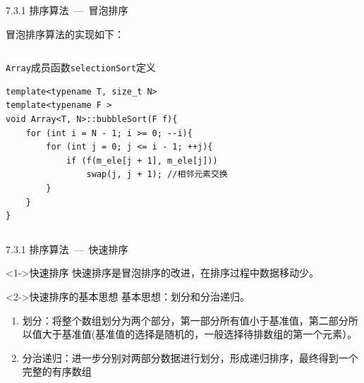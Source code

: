 
\begin{frame}[fragile]{7.3.1 排序算法\normalsize{~---~冒泡排序}}

冒泡排序算法的实现如下：

\vspace{-4mm}

\begin{columns}[t]

\begin{blueblock}{\texttt{Array}成员函数\texttt{selectionSort}定义}
\begin{lstlisting}[moreemph={Array,T,F}]
template<typename T, size_t N>
template<typename F >
void Array<T, N>::bubbleSort(F f){
    for (int i = N - 1; i >= 0; --i){
        for (int j = 0; j <= i - 1; ++j){
            if (f(m_ele[j + 1], m_ele[j]))
                swap(j, j + 1); //相邻元素交换
        }
    }
}
\end{lstlisting}
\end{blueblock}


\end{columns}

\end{frame}


\begin{frame}[fragile]{7.3.1 排序算法\normalsize{~---~快速排序}}

\begin{block}<1->{快速排序}
 快速排序是冒泡排序的改进，在排序过程中数据移动少。\\
\end{block}
\begin{block}<2->{快速排序的基本思想}
基本思想：划分和分治递归。\\
   \begin{enumerate}
     \item 划分：将整个数组划分为两个部分，第一部分所有值小于\alert{基准值}，第二部分所以值大于基准值(基准值的选择是随机的，一般选择待排数组的第一个元素）。
     \item 分治递归：进一步分别对两部分数据进行划分，形成递归排序，最终得到一个完整的有序数组
   \end{enumerate}
\end{block}
\end{frame}

